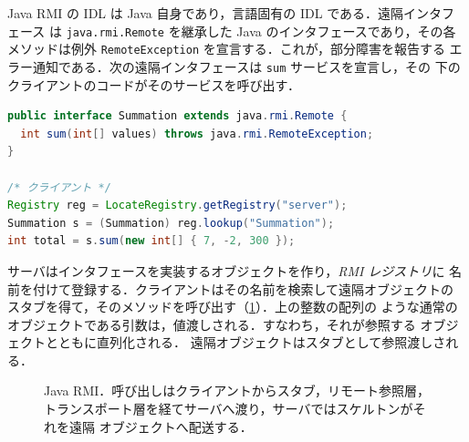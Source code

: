 \documentclass[../main.tex]{subfiles}
\begin{document}
Java RMI の IDL は Java 自身であり，言語固有の IDL である．遠隔インタフェース
は \texttt{java.rmi.Remote} を継承した Java のインタフェースであり，その各
メソッドは例外 \texttt{RemoteException} を宣言する．これが，部分障害を報告する
エラー通知である．次の遠隔インタフェースは \texttt{sum} サービスを宣言し，その
下のクライアントのコードがそのサービスを呼び出す．

\begin{lstlisting}[language=Java, numbers=none]
public interface Summation extends java.rmi.Remote {
  int sum(int[] values) throws java.rmi.RemoteException;
}

/* クライアント */
Registry reg = LocateRegistry.getRegistry("server");
Summation s = (Summation) reg.lookup("Summation");
int total = s.sum(new int[] { 7, -2, 300 });
\end{lstlisting}

サーバはインタフェースを実装するオブジェクトを作り，\emph{RMI レジストリ}に
名前を付けて登録する．クライアントはその名前を検索して遠隔オブジェクトの
スタブを得て，そのメソッドを呼び出す（\cref{fig:l13-rmi}）．上の整数の配列の
ような通常のオブジェクトである引数は，値渡しされる．すなわち，それが参照する
オブジェクトとともに直列化される．%
遠隔オブジェクトはスタブとして参照渡しされる．

\begin{figure}[htbp]
  \centering
  
  \caption{Java RMI．呼び出しはクライアントからスタブ，リモート参照層，
    トランスポート層を経てサーバへ渡り，サーバではスケルトンがそれを遠隔
    オブジェクトへ配送する．}
  \label{fig:l13-rmi}
\end{figure}
\end{document}
